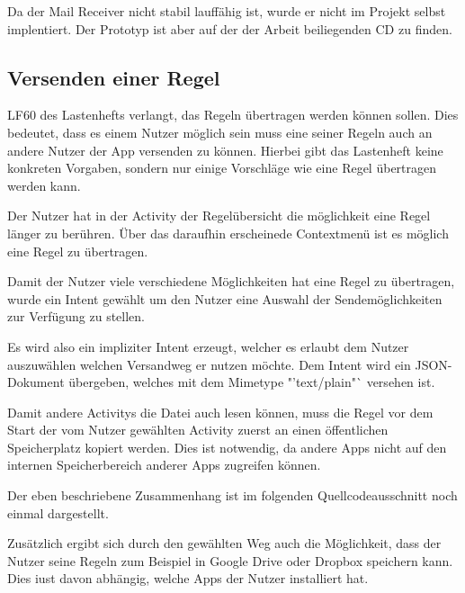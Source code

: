Da der Mail Receiver nicht stabil lauff\"ahig ist, wurde er nicht im Projekt selbst implentiert. Der Prototyp ist aber auf der der Arbeit beiliegenden CD zu finden.

\subsection{Versenden einer Regel}
LF60 des Lastenhefts verlangt, das Regeln \"ubertragen werden k\"onnen sollen. Dies bedeutet, dass es einem Nutzer m\"oglich sein muss eine seiner Regeln auch an andere Nutzer der App versenden zu k\"onnen. Hierbei gibt das Lastenheft keine konkreten Vorgaben, sondern nur einige Vorschl\"age wie eine Regel \"ubertragen werden kann.

Der Nutzer hat in der Activity der Regel\"ubersicht die m\"oglichkeit eine Regel l\"anger zu ber\"uhren. \"Uber das daraufhin erscheinede Contextmen\"u ist es m\"oglich eine Regel zu \"ubertragen.

Damit der Nutzer viele verschiedene M\"oglichkeiten hat eine Regel zu \"ubertragen, wurde ein Intent gew\"ahlt um den Nutzer eine Auswahl der Sendem\"oglichkeiten zur Verf\"ugung zu stellen.

Es wird also ein impliziter Intent erzeugt, welcher es erlaubt dem Nutzer auszuw\"ahlen welchen Versandweg er nutzen m\"ochte. Dem Intent wird ein JSON-Dokument \"ubergeben, welches mit dem Mimetype "'text/plain"` versehen ist.

Damit andere Activitys die Datei auch lesen k\"onnen, muss die Regel vor dem Start der vom Nutzer gew\"ahlten Activity zuerst an einen \"offentlichen Speicherplatz kopiert werden.
Dies ist notwendig, da andere Apps nicht auf den internen Speicherbereich anderer Apps zugreifen k\"onnen.

Der eben beschriebene Zusammenhang ist im folgenden Quellcodeausschnitt noch einmal dargestellt. \cite{AttachFileToIntent}



Zus\"atzlich ergibt sich durch den gew\"ahlten Weg auch die M\"oglichkeit, dass der Nutzer seine Regeln zum Beispiel in Google Drive oder Dropbox speichern kann. Dies iust davon abh\"angig, welche Apps der Nutzer installiert hat.